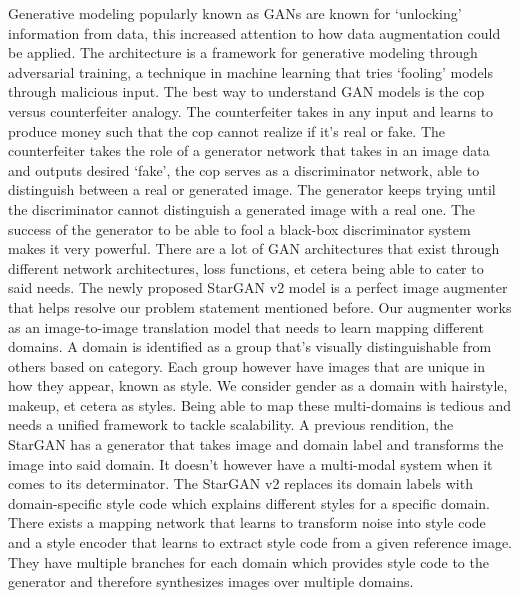 \documentclass[preprint,12pt]{elsarticle}
\begin{document}
Generative modeling popularly known as GANs are known for ‘unlocking’ information from data, this increased attention to how data augmentation could be applied. The architecture is a framework for generative modeling through adversarial training, a technique in machine learning that tries ‘fooling’ models through malicious input. The best way to understand GAN models is the cop versus counterfeiter analogy. The counterfeiter takes in any input and learns to produce money such that the cop cannot realize if it’s real or fake.  The counterfeiter takes the role of a generator network that takes in an image data and outputs desired ‘fake’, the cop serves as a discriminator network, able to distinguish between a real or generated image. The generator keeps trying until the discriminator cannot distinguish a generated image with a real one. The success of the generator to be able to fool a black-box discriminator system makes it very powerful. There are a lot of GAN architectures that exist through different network architectures, loss functions, et cetera being able to cater to said needs. The newly proposed StarGAN v2 \cite{choi2019stargan} model is a perfect image augmenter that helps resolve our problem statement mentioned before.   
Our augmenter works as an image-to-image translation model that needs to learn mapping different domains. A domain is identified as a group that’s visually distinguishable from others based on category. Each group however have images that are unique in how they appear, known as style. We consider gender as a domain with hairstyle, makeup, et cetera as styles. Being able to map these multi-domains is tedious and needs a unified framework to tackle scalability. A previous rendition, the StarGAN has a generator that takes image and domain label and transforms the image into said domain. It doesn’t however have a multi-modal system when it comes to its determinator. The StarGAN v2 replaces its domain labels with domain-specific style code which explains different styles for a specific domain. There exists a mapping network that learns to transform noise into style code and a style encoder that learns to extract style code from a given reference image. They have multiple branches for each domain which provides style code to the generator and therefore synthesizes images over multiple domains. 
\end{document}
